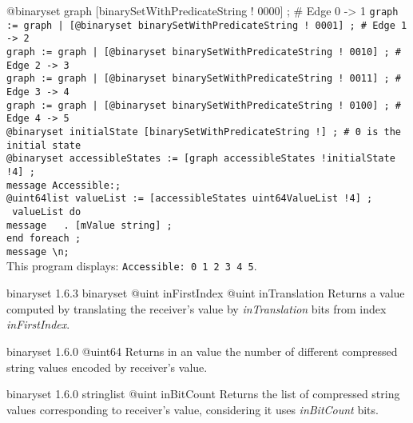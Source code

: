 \exempleUneLigne
{}
{@binaryset graph [binarySetWithPredicateString ! 0000\textquotedbl] ; \# Edge 0 -> 1}
\texttt{graph := graph | [@binaryset binarySetWithPredicateString ! 0001\textquotedbl] ; \# Edge 1 -> 2}\\
\texttt{graph := graph | [@binaryset binarySetWithPredicateString ! 0010\textquotedbl] ; \# Edge 2 -> 3}\\
\texttt{graph := graph | [@binaryset binarySetWithPredicateString ! 0011\textquotedbl] ; \# Edge 3 -> 4}\\
\texttt{graph := graph | [@binaryset binarySetWithPredicateString ! 0100\textquotedbl] ; \# Edge 4 -> 5}\\
\texttt{@binaryset initialState [binarySetWithPredicateString !\textquotedbl] ; \# 0 is the initial state}\\
\texttt{@binaryset accessibleStates := [graph accessibleStates !initialState !4] ;}\\
\texttt{message \textquotedbl Accessible:\textquotedbl ;}\\
\texttt{@uint64list valueList := [accessibleStates uint64ValueList !4] ;}\\
\texttt{ valueList do}\\
\texttt{message \textquotedbl~\textquotedbl~. [mValue string] ;}\\
\texttt{end foreach ;}\\
\texttt{message \textquotedbl\textbackslash n\textquotedbl ;}\\


This program displays: \texttt{Accessible: 0 1 2 3 4 5}.




{binaryset}
{1.6.3}
{binaryset}
{@uint inFirstIndex}
{@uint inTranslation}
{Returns a  value computed by translating the receiver's value by \emph{inTranslation} bits from index \emph{inFirstIndex}.}
{}



{binaryset}
{1.6.0}
{@uint64}
{Returns in an  value the number of different compressed string values encoded by receiver's value.}
{}




{binaryset}
{1.6.0}
{stringlist}
{@uint inBitCount}
{Returns the list of compressed string values corresponding to receiver's value, considering it uses \emph{inBitCount} bits.}
{}










